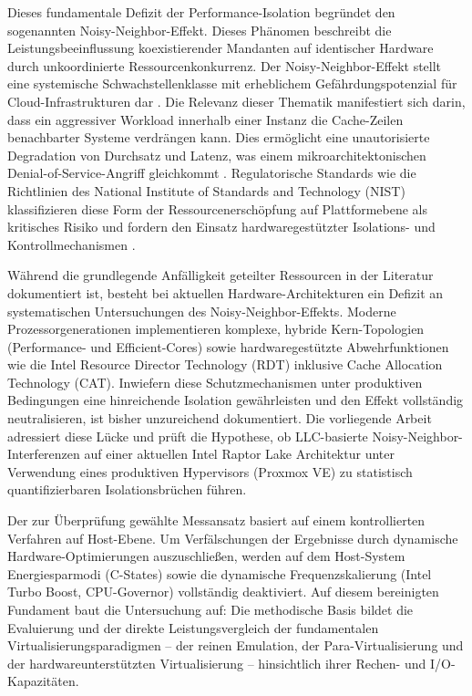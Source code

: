 \documentclass[conference]{IEEEtran}
\begin{document}
Dieses fundamentale Defizit der Performance-Isolation begründet den
sogenannten Noisy-Neighbor-Effekt. Dieses Phänomen beschreibt die
Leistungsbeeinflussung koexistierender Mandanten auf identischer Hardware
durch unkoordinierte Ressourcenkonkurrenz. Der Noisy-Neighbor-Effekt stellt
eine systemische Schwachstellenklasse mit erheblichem Gefährdungspotenzial
für Cloud-Infrastrukturen dar \cite{koh2007analysis}. Die Relevanz dieser
Thematik manifestiert sich darin, dass ein aggressiver Workload innerhalb
einer Instanz die Cache-Zeilen benachbarter Systeme verdrängen kann. Dies
ermöglicht eine unautorisierte Degradation von Durchsatz und Latenz, was einem
mikroarchitektonischen Denial-of-Service-Angriff gleichkommt
\cite{ge2018survey}. Regulatorische Standards wie die Richtlinien des
National Institute of Standards and Technology (NIST) klassifizieren diese
Form der Ressourcenerschöpfung auf Plattformebene als kritisches Risiko und
fordern den Einsatz hardwaregestützter Isolations- und Kontrollmechanismen
\cite{nist2014hypervisor}.

Während die grundlegende Anfälligkeit geteilter Ressourcen in der Literatur
dokumentiert ist, besteht bei aktuellen Hardware-Architekturen ein Defizit
an systematischen Untersuchungen des Noisy-Neighbor-Effekts. Moderne
Prozessorgenerationen implementieren komplexe, hybride Kern-Topologien
(Performance- und Efficient-Cores) sowie hardwaregestützte Abwehrfunktionen
wie die Intel Resource Director Technology (RDT) inklusive Cache Allocation
Technology (CAT). Inwiefern diese Schutzmechanismen unter produktiven
Bedingungen eine hinreichende Isolation gewährleisten und den Effekt
vollständig neutralisieren, ist bisher unzureichend dokumentiert. Die
vorliegende Arbeit adressiert diese Lücke und prüft die Hypothese, ob LLC-basierte
Noisy-Neighbor-Interferenzen auf einer aktuellen Intel Raptor Lake
Architektur unter Verwendung eines produktiven Hypervisors (Proxmox VE) zu
statistisch quantifizierbaren Isolationsbrüchen führen.

Der zur Überprüfung gewählte Messansatz basiert auf einem kontrollierten
Verfahren auf Host-Ebene. Um Verfälschungen der Ergebnisse durch dynamische
Hardware-Optimierungen auszuschließen, werden auf dem Host-System
Energiesparmodi (C-States) sowie die dynamische Frequenzskalierung (Intel
Turbo Boost, CPU-Governor) vollständig deaktiviert. Auf diesem bereinigten
Fundament baut die Untersuchung auf: Die methodische Basis bildet die
Evaluierung und der direkte Leistungsvergleich der fundamentalen
Virtualisierungsparadigmen – der reinen Emulation, der Para-Virtualisierung
und der hardwareunterstützten Virtualisierung – hinsichtlich ihrer Rechen-
und I/O-Kapazitäten.
\end{document}
